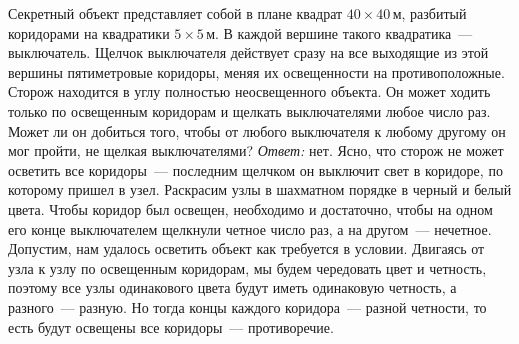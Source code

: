 \problem
Секретный объект представляет собой в плане квадрат $40 \times 40\,\text{м}$,
разбитый коридорами на квадратики $5 \times 5\,\text{м}$.
В каждой вершине такого квадратика~--- выключатель.
Щелчок выключателя действует сразу на все выходящие из этой вершины
пятиметровые коридоры, меняя их освещенности на противоположные.
Сторож находится в углу полностью неосвещенного объекта.
Он может ходить только по освещенным коридорам и щелкать выключателями любое
число раз.
Может ли он добиться того, чтобы от любого выключателя к любому другому он мог
пройти, не щелкая выключателями?
\solution
\emph{Ответ:} нет.
Ясно, что сторож не может осветить все коридоры~--- последним щелчком он
выключит свет в коридоре, по которому пришел в узел.
Раскрасим узлы в шахматном порядке в черный и белый цвета.
Чтобы коридор был освещен, необходимо и достаточно, чтобы на одном его конце
выключателем щелкнули четное число раз, а на другом~--- нечетное.
Допустим, нам удалось осветить объект как требуется в условии.
Двигаясь от узла к узлу по освещенным коридорам, мы будем чередовать цвет и
четность, поэтому все узлы одинакового цвета будут иметь одинаковую четность, а
разного~--- разную.
Но тогда концы каждого коридора~--- разной четности, то есть будут освещены все
коридоры~--- противоречие.
\endproblem
